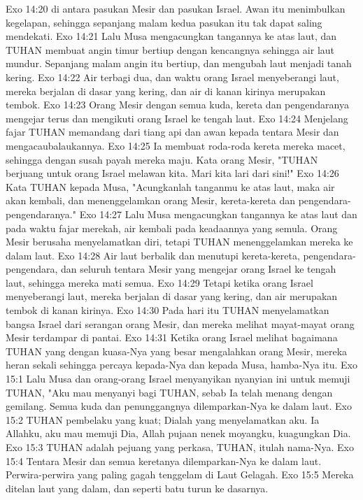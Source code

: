 Exo 14:20  di antara pasukan Mesir dan pasukan Israel. Awan itu menimbulkan kegelapan, sehingga sepanjang malam kedua pasukan itu tak dapat saling mendekati.
Exo 14:21  Lalu Musa mengacungkan tangannya ke atas laut, dan TUHAN membuat angin timur bertiup dengan kencangnya sehingga air laut mundur. Sepanjang malam angin itu bertiup, dan mengubah laut menjadi tanah kering.
Exo 14:22  Air terbagi dua, dan waktu orang Israel menyeberangi laut, mereka berjalan di dasar yang kering, dan air di kanan kirinya merupakan tembok.
Exo 14:23  Orang Mesir dengan semua kuda, kereta dan pengendaranya mengejar terus dan mengikuti orang Israel ke tengah laut.
Exo 14:24  Menjelang fajar TUHAN memandang dari tiang api dan awan kepada tentara Mesir dan mengacaubalaukannya.
Exo 14:25  Ia membuat roda-roda kereta mereka macet, sehingga dengan susah payah mereka maju. Kata orang Mesir, "TUHAN berjuang untuk orang Israel melawan kita. Mari kita lari dari sini!"
Exo 14:26  Kata TUHAN kepada Musa, "Acungkanlah tanganmu ke atas laut, maka air akan kembali, dan menenggelamkan orang Mesir, kereta-kereta dan pengendara-pengendaranya."
Exo 14:27  Lalu Musa mengacungkan tangannya ke atas laut dan pada waktu fajar merekah, air kembali pada keadaannya yang semula. Orang Mesir berusaha menyelamatkan diri, tetapi TUHAN menenggelamkan mereka ke dalam laut.
Exo 14:28  Air laut berbalik dan menutupi kereta-kereta, pengendara-pengendara, dan seluruh tentara Mesir yang mengejar orang Israel ke tengah laut, sehingga mereka mati semua.
Exo 14:29  Tetapi ketika orang Israel menyeberangi laut, mereka berjalan di dasar yang kering, dan air merupakan tembok di kanan kirinya.
Exo 14:30  Pada hari itu TUHAN menyelamatkan bangsa Israel dari serangan orang Mesir, dan mereka melihat mayat-mayat orang Mesir terdampar di pantai.
Exo 14:31  Ketika orang Israel melihat bagaimana TUHAN yang dengan kuasa-Nya yang besar mengalahkan orang Mesir, mereka heran sekali sehingga percaya kepada-Nya dan kepada Musa, hamba-Nya itu.
Exo 15:1  Lalu Musa dan orang-orang Israel menyanyikan nyanyian ini untuk memuji TUHAN, "Aku mau menyanyi bagi TUHAN, sebab Ia telah menang dengan gemilang. Semua kuda dan penunggangnya dilemparkan-Nya ke dalam laut.
Exo 15:2  TUHAN pembelaku yang kuat; Dialah yang menyelamatkan aku. Ia Allahku, aku mau memuji Dia, Allah pujaan nenek moyangku, kuagungkan Dia.
Exo 15:3  TUHAN adalah pejuang yang perkasa, TUHAN, itulah nama-Nya.
Exo 15:4  Tentara Mesir dan semua keretanya dilemparkan-Nya ke dalam laut. Perwira-perwira yang paling gagah tenggelam di Laut Gelagah.
Exo 15:5  Mereka ditelan laut yang dalam, dan seperti batu turun ke dasarnya.
